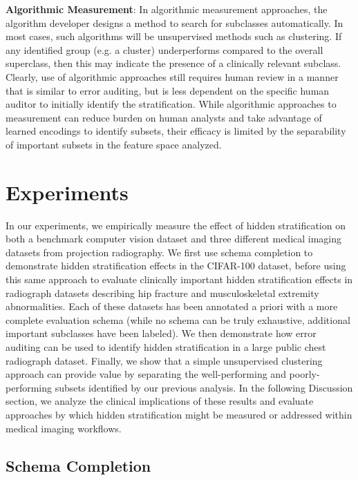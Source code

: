 \documentclass{article}
\begin{document}
\textbf{Algorithmic Measurement}: In algorithmic measurement approaches, the algorithm developer designs a method to search for subclasses automatically. 
In most cases, such algorithms will be unsupervised methods such as clustering. 
If any identified group (e.g. a cluster) underperforms compared to the overall superclass, then this may indicate the presence of a clinically relevant subclass.
Clearly, use of algorithmic approaches still requires human review in a manner that is similar to error auditing, but is less dependent on the specific human auditor to initially identify the stratification.  
While algorithmic approaches to measurement can reduce burden on human analysts and take advantage of learned encodings to identify subsets, their efficacy is limited by the separability of important subsets in the feature space analyzed.

\section{Experiments}

In our experiments, we empirically measure the effect of hidden stratification on both a benchmark computer vision dataset and three different medical imaging datasets from projection radiography.  
We first use schema completion to demonstrate hidden stratification effects in the CIFAR-100 dataset, before using this same approach to evaluate clinically important hidden stratification effects in radiograph datasets describing hip fracture and musculoskeletal extremity abnormalities.
Each of these datasets has been annotated a priori with a more complete evaluation schema (while no schema can be truly exhaustive, additional important subclasses have been labeled).
We then demonstrate how error auditing can be used to identify hidden stratification in a large public chest radiograph dataset.
Finally, we show that a simple unsupervised clustering approach can provide value by separating the well-performing and poorly-performing subsets identified by our previous analysis.
In the following Discussion section, we analyze the clinical implications of these results and evaluate approaches by which hidden stratification might be measured or addressed within medical imaging workflows.

\subsection{Schema Completion}
\end{document}
